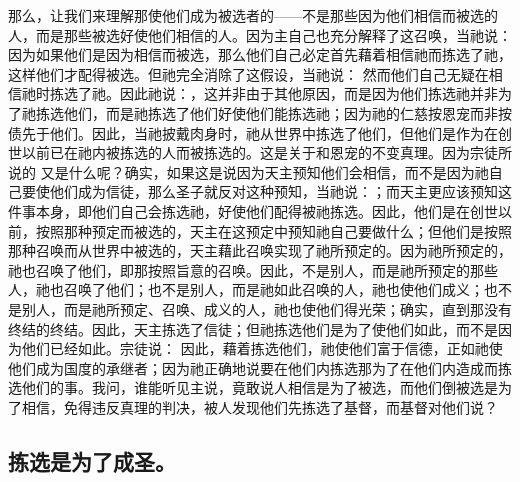 那么，让我们来理解那使他们成为被选者的——不是那些因为他们相信而被选的人，而是那些被选好使他们相信的人。因为主自己也充分解释了这召唤，当祂说：  因为如果他们是因为相信而被选，那么他们自己必定首先藉着相信祂而拣选了祂，这样他们才配得被选。但祂完全消除了这假设，当祂说： 然而他们自己无疑在相信祂时拣选了祂。因此祂说：，这并非由于其他原因，而是因为他们拣选祂并非为了祂拣选他们，而是祂拣选了他们好使他们能拣选祂；因为祂的仁慈按恩宠而非按债先于他们。因此，当祂披戴肉身时，祂从世界中拣选了他们，但他们是作为在创世以前已在祂内被拣选的人而被拣选的。这是关于和恩宠的不变真理。因为宗徒所说的  又是什么呢？确实，如果这是说因为天主预知他们会相信，而不是因为祂自己要使他们成为信徒，那么圣子就反对这种预知，当祂说：；而天主更应该预知这件事本身，即他们自己会拣选祂，好使他们配得被祂拣选。因此，他们是在创世以前，按照那种预定而被选的，天主在这预定中预知祂自己要做什么；但他们是按照那种召唤而从世界中被选的，天主藉此召唤实现了祂所预定的。因为祂所预定的，祂也召唤了他们，即那按照旨意的召唤。因此，不是别人，而是祂所预定的那些人，祂也召唤了他们；也不是别人，而是祂如此召唤的人，祂也使他们成义；也不是别人，而是祂所预定、召唤、成义的人，祂也使他们得光荣；确实，直到那没有终结的终结。因此，天主拣选了信徒；但祂拣选他们是为了使他们如此，而不是因为他们已经如此。宗徒说：  因此，藉着拣选他们，祂使他们富于信德，正如祂使他们成为国度的承继者；因为祂正确地说要在他们内拣选那为了在他们内造成而拣选他们的事。我问，谁能听见主说，竟敢说人相信是为了被选，而他们倒被选是为了相信，免得违反真理的判决，被人发现他们先拣选了基督，而基督对他们说？ \par


\subsection{拣选是为了成圣。}

